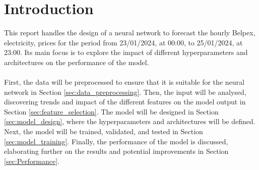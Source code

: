 \section{Introduction}
\label{sec:introduction}
This report handles the design of a neural network to forecast the hourly Belpex, electricity, prices for the period from 23/01/2024, at 00:00, to 25/01/2024, at 23:00. Its main focus is to explore the impact of different hyperparameters and architectures on the performance of the model.
\\ \\
First, the data will be preprocessed to ensure that it is suitable for the neural network in Section \ref{sec:data_preprocessing}. Then, the input will be analysed, discovering trends and impact of the different features on the model output in Section \ref{sec:feature_selection}. The model will be designed in Section \ref{sec:model_design}, where the hyperparameters and architectures will be defined. Next, the model will be trained, validated, and tested in Section \ref{sec:model_training}. Finally, the performance of the model is discussed, elaborating further on the results and potential improvements in Section \ref{sec:Performance}.




